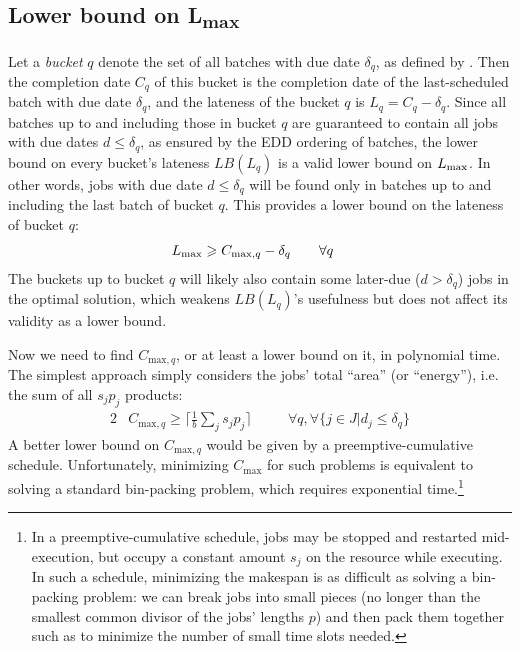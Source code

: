 \documentclass[13pt, letterpaper, oneside]{book}
\begin{document}
\subsection[Lower bound on $\Lmax$]{Lower bound on {\sansitalicfont L}\textsubscript{max}}
Let a \textit{bucket} $q$ denote the set of all batches with due date
$\delta_q$, as defined by \citet{Malapert}.
Then the completion date $C_q$ of this bucket is the completion date of the
last-scheduled batch with due date $\delta_q$, and the lateness of the bucket
$q$ is $L_q = C_q - \delta_q$. Since all batches up to and including those in
bucket $q$ are guaranteed to contain all jobs with due dates $d \leq \delta_q$,
as ensured by the EDD ordering of batches, the lower bound on every bucket's
lateness $LB(L_q)$ is a valid lower bound on $\Lmax$. In other words,
jobs with due date $d \leq \delta_q$ will be found only in batches up to and
including the last
batch of bucket $q$. This provides a lower bound on the lateness of bucket $q$:
\begin{alignat}{2}
& L_{\text{max}} \geqslant C_{\text{max},q} - \delta_q \quad && \forall q
\end{alignat}
The buckets up to bucket $q$ will likely also contain some later-due ($d >
\delta_q$) jobs in the optimal solution, which weakens $LB(L_q)$'s usefulness
but does not affect its validity as a lower bound.

Now we need to find $C_{\text{max},q}$, or at least a lower bound on it, in
polynomial time. The simplest approach simply considers the jobs' total ``area''
(or ``energy''), i.e. the sum of all $s_j p_j$ products:
\begin{alignat}{2}
& C_{\text{max},q} \geq \big\lceil\frac{1}{b} \sum_{j} s_j
p_j\big\rceil \quad
&& \forall q, \forall \{ j \in J | d_j \leq \delta_q \}
\end{alignat}
A better lower bound on $C_{\text{max},q}$ would be given by a
preemptive-cumulative schedule. Unfortunately, minimizing $C_{\text{max}}$ for
such problems is equivalent to solving a standard bin-packing problem, which
requires exponential time.\footnote{In a preemptive-cumulative schedule, jobs
may be stopped and restarted mid-execution, but occupy a constant amount $s_j$
on the resource while executing. In such a schedule, minimizing the makespan is
as difficult as solving a bin-packing problem: we can break jobs into small
pieces (no longer than the smallest common divisor of the jobs' lengths $p$) and
then pack them together such as to minimize the number of small time slots
needed.}
\end{document}
